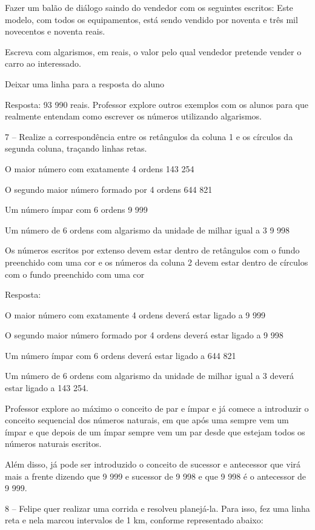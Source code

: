 Fazer um balão de diálogo saindo do vendedor com os seguintes escritos:
Este modelo, com todos os equipamentos, está sendo vendido por noventa e
três mil novecentos e noventa reais.

Escreva com algarismos, em reais, o valor pelo qual vendedor pretende
vender o carro ao interessado.

Deixar uma linha para a resposta do aluno

Resposta: 93 990 reais. Professor explore outros exemplos com os alunos
para que realmente entendam como escrever os números utilizando
algarismos.

7 -- Realize a correspondência entre os retângulos da coluna 1 e os
círculos da segunda coluna, traçando linhas retas.

O maior número com exatamente 4 ordens 143 254

O segundo maior número formado por 4 ordens 644 821

Um número ímpar com 6 ordens 9 999

Um número de 6 ordens com algarismo da unidade de milhar igual a 3 9 998

Os números escritos por extenso devem estar dentro de retângulos com o
fundo preenchido com uma cor e os números da coluna 2 devem estar dentro
de círculos com o fundo preenchido com uma cor

Resposta:

O maior número com exatamente 4 ordens deverá estar ligado a 9 999

O segundo maior número formado por 4 ordens deverá estar ligado a 9 998

Um número ímpar com 6 ordens deverá estar ligado a 644 821

Um número de 6 ordens com algarismo da unidade de milhar igual a 3
deverá estar ligado a 143 254.

Professor explore ao máximo o conceito de par e ímpar e já comece a
introduzir o conceito sequencial dos números naturais, em que após uma
sempre vem um ímpar e que depois de um ímpar sempre vem um par desde que
estejam todos os números naturais escritos.

Além disso, já pode ser introduzido o conceito de sucessor e antecessor
que virá mais a frente dizendo que 9 999 e sucessor de 9 998 e que 9 998
é o antecessor de 9 999.

8 -- Felipe quer realizar uma corrida e resolveu planejá-la. Para isso,
fez uma linha reta e nela marcou intervalos de 1 km, conforme
representado abaixo:

